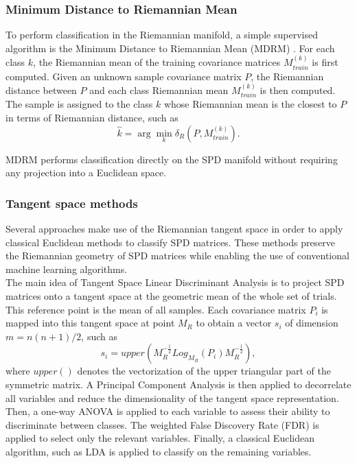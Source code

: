 \documentclass[11pt,a4paper]{article}
\begin{document}
\subsubsection{Minimum Distance to Riemannian Mean}
To perform classification in the Riemannian manifold, a simple supervised algorithm is the Minimum Distance to Riemannian Mean (MDRM) \cite{barachant2012} \cite{MDMR}. For each class $k$, the Riemannian mean of the training covariance matrices $M_{train}^{(k)}$ is first computed. Given an unknown sample covariance matrix $P$, the Riemannian distance between $P$ and each class Riemannian mean $M_{train}^{(k)}$ is then computed. The sample is assigned to the class $k$ whose Riemannian mean is the closest to $P$ in terms of Riemannian distance, such as \[ \hat{k} = \arg\min_{k} \delta_R(P,M_{train}^{(k)}).\] 

\noindent MDRM performs classification directly on the SPD manifold without requiring any projection into a Euclidean space.


\subsubsection{Tangent space methods}
Several approaches make use of the Riemannian tangent space in order to apply classical Euclidean methods to classify SPD matrices. These methods preserve the Riemannian geometry of SPD matrices while enabling the use of conventional machine learning algorithms. \\

\noindent The main idea of Tangent Space Linear Discriminant Analysis \cite{barachant2012} is to project SPD matrices onto a tangent space at the geometric mean of the whole set of trials. This reference point is the mean of all samples.
Each covariance matrix $P_i$ is mapped into this tangent space at point $M_R$ to obtain a vector $s_i$ of dimension $m = n(n+1)/2$, such as \[ s_i = upper(M_R^{-\frac{1}{2}} Log_{M_R}(P_i) M_R^{-\frac{1}{2}}),\] where $upper()$ denotes the vectorization of the upper triangular part of the symmetric matrix. 
\newline
A Principal Component Analysis is then applied to decorrelate all variables and reduce the dimensionality of the tangent space representation. Then, a one-way ANOVA is applied to each variable to assess their ability to discriminate between classes.
The weighted False Discovery Rate (FDR) is applied to select only the relevant variables.
Finally, a classical Euclidean algorithm, such as LDA is applied to classify on the remaining variables.
\end{document}
